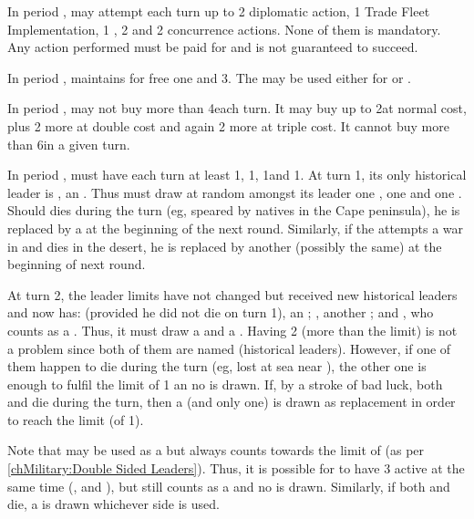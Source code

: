 \begin{exemple}
  In period , \POR may attempt each turn up to 2 diplomatic action,
  1 Trade Fleet Implementation, 1 \COL, 2 \TP and 2 concurrence actions. None
  of them is mandatory. Any action performed must be paid for and is not
  guaranteed to succeed.

  In period , \POR maintains for free one \FLEET\facemoins and
  3\GD. The \GD may be used either for \LD or \ND.

  In period , \POR may not buy more than 4\ND each turn. It may buy
  up to 2\LD at normal cost, plus 2 more at double cost and again 2 more at
  triple cost. It cannot buy more than 6\LD in a given turn.

  In period , \POR must have each turn at least 1\LeaderG,
  1\LeaderA, 1\LeaderC and 1\LeaderE. At turn 1, its only historical leader is
  \leaderDias, an \LeaderE. Thus \POR must draw at random amongst its leader
  one \anonyme\LeaderG, one \anonyme\LeaderA and one \anonyme\LeaderC. Should
  \leaderDias dies during the turn (eg, speared by natives in the Cape
  peninsula), he is replaced by a \anonyme\LeaderE at the beginning of the
  next round. Similarly, if the \anonyme\LeaderG attempts a war in \paysMaroc
  and dies in the desert, he is replaced by another \anonyme\LeaderG (possibly
  the same) at the beginning of next round.

  At turn 2, the leader limits have not changed but \POR received new
  historical leaders and now has: \leaderDias (provided he did not die on turn
  1), an \LeaderE ; \leaderCabral, another \LeaderE ; and ,
  who counts as a \LeaderC. Thus, it must draw a \anonyme\LeaderG and a
  \anonyme\LeaderA. Having 2 \LeaderE (more than the limit) is not a problem
  since both of them are named (historical leaders). However, if one of them
  happen to die during the turn (eg, lost at sea near \continentBresil), the
  other one is enough to fulfil the limit of 1 an no \anonyme\LeaderE is
  drawn. If, by a stroke of bad luck, both \leaderDias and \leaderCabral die
  during the turn, then a \anonyme\LeaderE (and only one) is drawn as
  replacement in order to reach the limit (of 1).

  Note that  may be used as a \LeaderE but always counts
  towards the limit of \LeaderC (as per \ref{chMilitary:Double Sided
    Leaders}). Thus, it is possible for \POR to have 3 \LeaderE active at the
  same time (\leaderDias, \leaderCabral and ), but  still counts as a \LeaderC and no \anonyme\LeaderC is
  drawn. Similarly, if both \leaderDias and \leaderCabral die, a
  \anonyme\LeaderE is drawn whichever side  is used.
\end{exemple}




